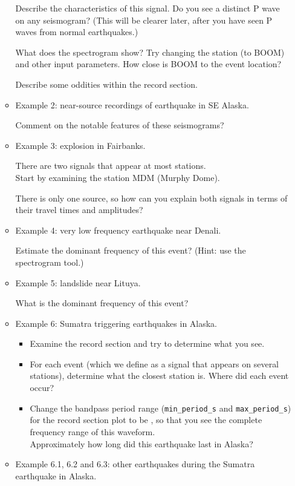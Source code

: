 \documentclass[11pt,titlepage,fleqn]{article}
\begin{document}
\begin{enumerate}
\begin{itemize}
Describe the characteristics of this signal. Do you see a distinct P wave on any seismogram? (This will be clearer later, after you have seen P waves from normal earthquakes.)

What does the spectrogram show? Try changing the station (\eg to BOOM) and other input parameters. How close is BOOM to the event location?

Describe some oddities within the record section.

\item Example 2: near-source recordings of  earthquake in SE Alaska. 

Comment on the notable features of these seismograms?

\item Example 3: explosion in Fairbanks. 

There are two signals that appear at most stations. \\
Start by examining the station MDM (Murphy Dome).

There is only one source, so how can you explain both signals in terms of their travel times and amplitudes?

\item Example 4: very low frequency earthquake near Denali. 

Estimate the dominant frequency of this event? (Hint: use the spectrogram tool.)

\item Example 5: landslide near Lituya. 

What is the dominant frequency of this event?

\item Example 6: Sumatra  triggering earthquakes in Alaska. 
%
\begin{itemize}
\item Examine the record section and try to determine what you see.
\item For each event (which we define as a signal that appears on several stations), determine what the closest station is. Where did each event occur?
\item Change the bandpass period range (\verb+min_period_s+ and \verb+max_period_s+) for the record section plot to be , so that you see the complete frequency range of this waveform. \\
Approximately how long did this earthquake last in Alaska?
\end{itemize}

\item Example 6.1, 6.2 and 6.3: other earthquakes during the Sumatra  earthquake in Alaska.


\end{itemize}
\end{enumerate}
\end{document}
